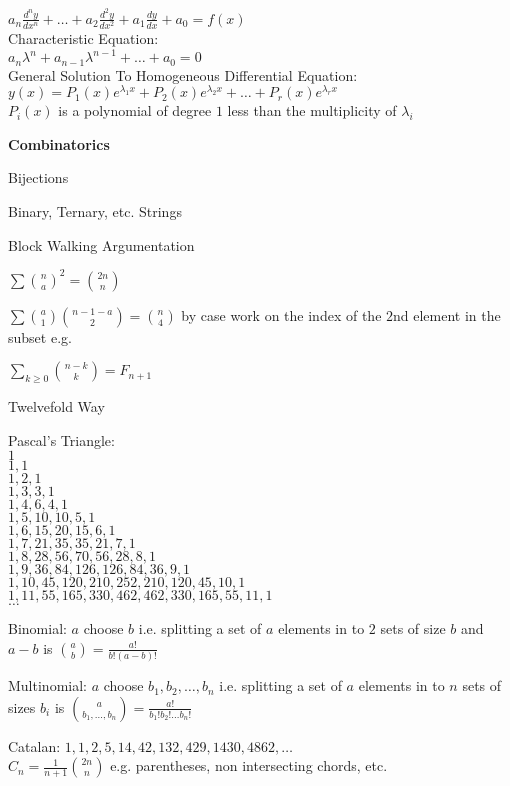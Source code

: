 $a_n \frac{d^n y}{d x^n}+\dots+a_2 \frac{d^2 y}{d x^2}+a_1 \frac{dy}{dx} + a_0 = f(x)$ \\
Characteristic Equation: \\
$a_n \lambda^n + a_{n-1} \lambda^{n-1} + \dots + a_0 = 0$ \\
General Solution To Homogeneous Differential Equation: \\
$y(x)=P_1 (x)e^{\lambda_1 x}+P_2 (x) e^{\lambda_2 x} + \dots + P_r (x) e^{\lambda_r x}$ \\
$P_i (x)$ is a polynomial of degree $1$ less than the multiplicity of $\lambda_i$

\newpage

\textbf{Combinatorics}

Bijections

Binary, Ternary, etc. Strings

Block Walking Argumentation

$\sum \binom{n}{a}^2 = \binom{2n}{n}$

$\sum \binom{a}{1} \binom{n-1-a}{2} = \binom{n}{4}$ by case work on the index of the $2$nd element in the subset e.g.

$\sum_{k \ge 0} \binom{n-k}{k} = F_{n+1}$

Twelvefold Way

Pascal's Triangle: \\
$1$ \\
$1,1$ \\
$1,2,1$ \\
$1,3,3,1$ \\
$1,4,6,4,1$ \\
$1,5,10,10,5,1$ \\
$1,6,15,20,15,6,1$ \\
$1,7,21,35,35,21,7,1$ \\
$1,8,28,56,70,56,28,8,1$ \\
$1,9,36,84,126,126,84,36,9,1$ \\
$1,10,45,120,210,252,210,120,45,10,1$ \\
$1,11,55,165,330,462,462,330,165,55,11,1$ \\
$\dots$

Binomial: $a$ choose $b$ i.e. splitting a set of $a$ elements in to $2$ sets of size $b$ and $a-b$ is $\binom{a}{b}=\frac{a!}{b!(a-b)!}$

Multinomial: $a$ choose $b_1,b_2,\dots,b_n$ i.e. splitting a set of $a$ elements in to $n$ sets of sizes $b_i$ is $\binom{a}{b_1,\dots,b_n}=\frac{a!}{b_1!b_2!\dots b_n!}$

Catalan: $1,1,2,5,14,42,132,429,1430,4862,\dots$ \\
$C_n = \frac{1}{n+1} \binom{2n}{n}$ e.g. parentheses, non intersecting chords, etc.


